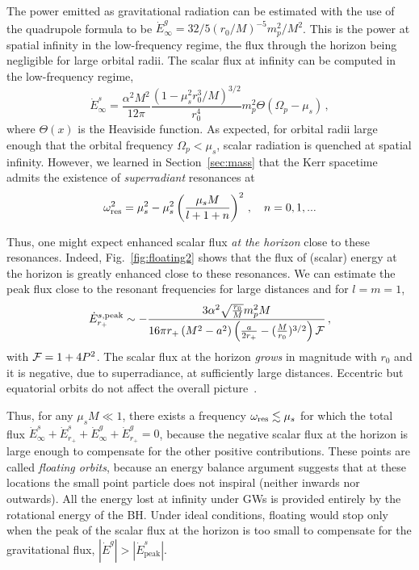 \documentclass[11pt]{article}
\newcommand{\be}{\begin{equation}}
\newcommand{\ee}{\end{equation}}
\numberwithin{equation}{section} %
\begin{document}
The power emitted as gravitational radiation can be estimated with the use of the quadrupole formula to be
$\dot E^{g}_\infty={32}/{5}\left({r_0}/{M}\right)^{-5}m_p^2/M^2$. This is the power at spatial infinity
in the low-frequency regime, the flux through the horizon being negligible for large orbital radii.
The scalar flux at infinity can be computed in the low-frequency regime,
%
\be
\dot E^{s}_{\infty}=\frac{\alpha^2M^2}{12\pi}\frac{\left(1-\mu_s^2r_0^3/M\right)^{3/2}}{r_0^4}m_p^2
\Theta(\Omega_p-\mu_s)\,,\label{dipole}
\ee
%
where $\Theta(x)$ is the Heaviside function. As expected, for orbital radii large enough that the orbital frequency 
$\Omega_p<\mu_s$, scalar radiation is quenched at spatial infinity.
However, we learned in Section~\ref{sec:mass} that the Kerr spacetime admits the existence of {\it superradiant} 
resonances at
%
\be
\omega_{\rm res}^2=\mu_s^2-\mu_s^2\left(\frac{\mu_s M}{l+1+n}\right)^2\,,\quad n=0,1,...\label{om_resonance}
\ee
%

Thus, one might expect enhanced scalar flux {\it at the horizon} close to these resonances. Indeed, 
Fig.~\ref{fig:floating2} shows that the flux of (scalar) energy
at the horizon is greatly enhanced close to these resonances. We can estimate the peak flux close to the resonant 
frequencies for large distances and for $l=m=1$,
%
\be
\dot{E}^{s, {\rm peak}}_{r_+}\sim -\frac{3 \alpha ^2  \sqrt{\frac{r_0}{M}}m_p^2 M}{16\pi 
r_+\left(M^2-a^2\right)\left(\frac{a}{2r_+}-(\frac{M}{r_0})^{3/2}\right){\cal F}}\,,
\label{flux_ana_fin2}
\ee
%
with ${\cal F}=1+4 P^2$. The scalar flux at the horizon {\it grows} in magnitude with $r_0$ and it is negative, due to 
superradiance, at sufficiently large distances. Eccentric but equatorial orbits do not affect the overall picture~\cite{Fujita:2016yav}.


Thus, for any $\mu_s M\ll1$, there exists a frequency $\omega_{\rm res}\lesssim\mu_s$ for which the total flux $\dot 
E^{s}_\infty+\dot E^{s}_{r_+}+\dot E^{g}_\infty+\dot E^{g}_{r_+}=0$, because the negative scalar flux at the horizon is 
large enough to compensate for the other positive contributions. These points are called {\it floating orbits}, because 
an energy balance argument suggests that at these locations the small point particle does not inspiral (neither inwards nor outwards). All the energy lost at  infinity under GWs is provided entirely by the rotational energy of the BH.
Under ideal conditions, floating would stop only when the peak of the scalar flux at the horizon is too small to 
compensate for the gravitational flux, $|\dot E^{g}|>|\dot E_\text{peak}^{s}|$.
\end{document}
